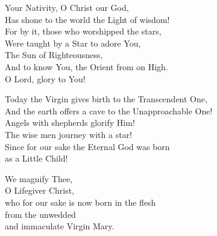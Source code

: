 \documentclass{article}
\begin{document}
%
%
Your Nativity, O Christ our God,\\
Has shone to the world the Light of wisdom!\\
For by it, those who worshipped the stars,\\
Were taught by a Star to adore You,\\
The Sun of Righteousness,\\
And to know You, the Orient from on High.\\
O Lord, glory to You!

%
Today the Virgin gives birth to the Transcendent One,\\
And the earth offers a cave to the Unapproachable One!\\
Angels with shepherds glorify Him!\\
The wise men journey with a star!\\
Since for our sake the Eternal God was born\\
as a Little Child!

%
We magnify Thee, \\
O Lifegiver Christ, \\
who for our sake is now born in the flesh\\
from the unwedded\\
and immaculate Virgin Mary.
\end{document}

